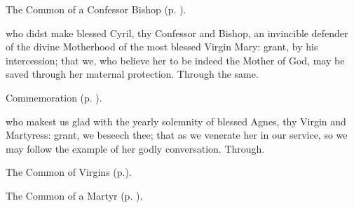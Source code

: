 \vspace{-0.25\baselineskip}


\begin{rubric}
	The Common of a Confessor Bishop (p. \pageref{CommonConfessorBishop}).
\end{rubric}

{} who didst make blessed Cyril, thy Confessor and Bishop, an invincible defender of the divine Motherhood of the most blessed Virgin Mary: grant, by his intercession; that we, who believe her to be indeed the Mother of God, may be saved through her maternal protection. Through the same.

\begin{rubric}
    Commemoration  (p. \pageref{AgnesCollectII}).
\end{rubric}


\vspace{-0.25\baselineskip}


\memorialCollect\label{AgnesCollectII}
 who makest us glad with the yearly solemnity of blessed Agnes, thy Virgin and Martyress: grant, we beseech thee; that as we venerate her in our service, so we may follow the example of her godly conversation. Through.


\vspace{-0.25\baselineskip}


\begin{rubric}
	The Common of Virgins (p.\pageref{VirginMartyressCollect}).
\end{rubric}


\vspace{-0.25\baselineskip}


\begin{rubric}
	The Common of a Martyr (p. \pageref{CommonMartyr}).
\end{rubric}

